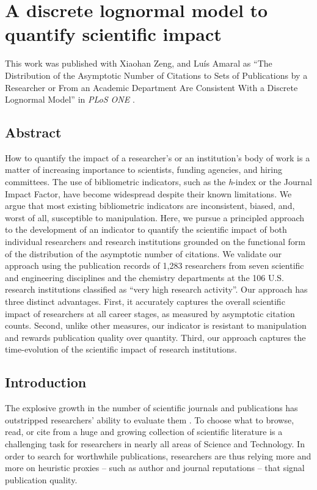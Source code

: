\chapter{A discrete lognormal model to quantify scientific impact}
\label{ch:lognormal}

This work was published with
Xiaohan Zeng, and
Lu\'{i}s Amaral as
``The Distribution of the Asymptotic Number of Citations to Sets of Publications by a Researcher or From an Academic Department Are Consistent With a Discrete Lognormal Model''
in \textit{PLoS ONE} \cite{Moreira2015}.


\section{Abstract}

How to quantify the impact of a researcher's or an institution's body of work is a matter of increasing importance to scientists, funding agencies, and hiring committees. The use of bibliometric indicators, such as the \emph{h}-index or the Journal Impact Factor, have become widespread despite their known limitations. We argue that most existing bibliometric indicators are inconsistent, biased, and, worst of all, susceptible to manipulation. Here, we pursue a principled approach to the development of an indicator to quantify the scientific impact of both individual researchers and research institutions grounded on the functional form of the distribution of the asymptotic number of citations. We validate our approach using the publication records of 1,283 researchers from seven scientific and engineering disciplines and the chemistry departments at the 106 U.S. research institutions classified as ``very high research activity''. Our approach has three distinct advantages. First, it accurately captures the overall scientific impact of researchers at all career stages, as measured by asymptotic citation counts. Second, unlike other measures, our indicator is resistant to manipulation and rewards publication quality over quantity. Third, our approach captures the time-evolution of the scientific impact of research institutions.

\clearpage

\section{Introduction}

The explosive growth in the number of scientific journals and publications has outstripped researchers' ability to evaluate them \cite{Nicholas2014}. To choose what to browse, read, or cite from a huge and growing collection of scientific literature is a challenging task for researchers in nearly all areas of Science and Technology. In order to search for worthwhile publications, researchers are thus relying more and more on heuristic proxies -- such as author and journal reputations -- that signal publication quality.

